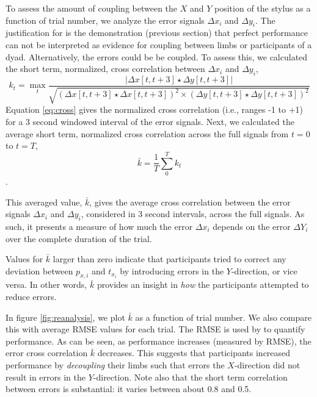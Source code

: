 \documentclass[11pt]{article}
\begin{document}
To assess the amount of coupling between the $X$ and $Y$ position of the stylus as a function of trial number, we analyze the error signals $\Delta x_i$ and $\Delta y_i$. The justification for is the demonstration (previous section) that perfect performance can not be interpreted as evidence for coupling between limbs or participants of a dyad. Alternatively, the errors could be be coupled. To assess this, we calculated the short term, normalized, cross correlation between $\Delta x_i$ and $\Delta y_i$,
%
\begin{equation}
k_t = \max_t \frac{| \Delta x [t,t+3] \star \Delta y [t,t+3] |}{\sqrt{(\Delta x [t,t+3]  \star \Delta x [t,t+3] )^2 \times (\Delta y [t,t+3]  \star \Delta y [t,t+3] )^2} }
\label{eq:cross}
\end{equation}
%
Equation \ref{eq:cross} gives the normalized cross correlation (i.e., ranges -1 to +1) for a 3 second windowed interval of the error signals. Next, we calculated the average short term, normalized cross correlation across the full signals from $t=0$ to $t=T$,
%
\begin{equation}
\bar{k} = \frac{1}{T} \sum_0^T k_t
\end{equation}.

This averaged value, $\bar{k}$, gives the average cross correlation between the error signals $\Delta x_i$ and $\Delta y_i$, considered in 3 second intervals, across the full signals. As such, it presents a measure of how much the error $\Delta x_i$ depends on the error $\Delta Y_i$ over the complete duration of the trial. 

Values for $\bar{k}$ larger than zero indicate that participants tried to correct any deviation between $p_{x,i}$ and $t_{x_i}$ by introducing errors in the $Y$-direction, or vice versa. In other words, $\bar{k}$ provides an insight in \textit{how} the participants attempted to reduce errors.

In figure \ref{fig:reanalysis}, we plot $\bar{k}$  as a function of trial number. We also compare this with average RMSE values for each trial. The RMSE is used by \citet{Annand2020} to quantify performance. As can be seen, as performance increases (measured by RMSE), the error cross correlation $\bar{k}$ decreases. This suggests that participants increased performance by \textit{decoupling} their limbs such that errors the $X$-direction did not result in errors in the $Y$-direction. Note also that the short term correlation between errors is substantial: it varies between about 0.8 and 0.5.
\end{document}
